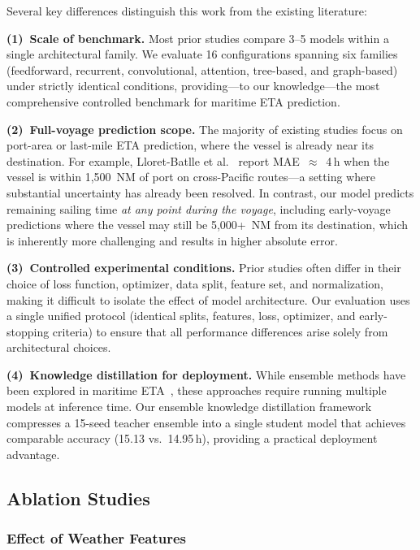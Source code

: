 \documentclass[conference]{IEEEtran}
\begin{document}
Several key differences distinguish this work from the existing literature:

\textbf{(1)~Scale of benchmark.}
Most prior studies compare 3--5 models within a single architectural family.
We evaluate 16 configurations spanning six families (feedforward, recurrent, convolutional, attention, tree-based, and graph-based) under strictly identical conditions, providing---to our knowledge---the most comprehensive controlled benchmark for maritime ETA prediction.

\textbf{(2)~Full-voyage prediction scope.}
The majority of existing studies focus on port-area or last-mile ETA prediction, where the vessel is already near its destination.
For example, Lloret-Batlle et al.~\cite{lloretbatlle2025} report MAE~$\approx$~4\,h when the vessel is within 1,500~NM of port on cross-Pacific routes---a setting where substantial uncertainty has already been resolved.
In contrast, our model predicts remaining sailing time \textit{at any point during the voyage}, including early-voyage predictions where the vessel may still be 5,000+~NM from its destination, which is inherently more challenging and results in higher absolute error.

\textbf{(3)~Controlled experimental conditions.}
Prior studies often differ in their choice of loss function, optimizer, data split, feature set, and normalization, making it difficult to isolate the effect of model architecture.
Our evaluation uses a single unified protocol (identical splits, features, loss, optimizer, and early-stopping criteria) to ensure that all performance differences arise solely from architectural choices.

\textbf{(4)~Knowledge distillation for deployment.}
While ensemble methods have been explored in maritime ETA~\cite{saberHighaccuracyPredictionVessels2025,chuVesselArrivalTime2025}, these approaches require running multiple models at inference time.
Our ensemble knowledge distillation framework compresses a 15-seed teacher ensemble into a single student model that achieves comparable accuracy (15.13 vs.\ 14.95\,h), providing a practical deployment advantage.


\subsection{Ablation Studies}
\label{sec:ablations}

\subsubsection{Effect of Weather Features}
\end{document}
